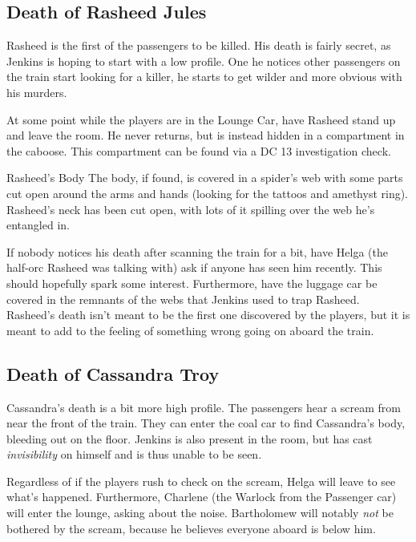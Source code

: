 \documentclass[letterpaper,10pt,twoside,twocolumn,openany]{dndbook}
\begin{document}
\subsection{Death of Rasheed Jules}
Rasheed is the first of the passengers to be killed.  His death is fairly secret, as Jenkins is hoping to start with a low profile.  One he notices other passengers on the train start looking for a killer, he starts to get wilder and more obvious with his murders.

At some point while the players are in the Lounge Car, have Rasheed stand up and leave the room.  He never returns, but is instead hidden in a compartment in the caboose.  This compartment can be found via a DC 13 investigation check.

\begin{paperbox}{Rasheed's Body}
  The body, if found, is covered in a spider's web with some parts cut open around the arms and hands (looking for the tattoos and amethyst ring).  Rasheed's neck has been cut open, with lots of it spilling over the web he's entangled in.
\end{paperbox}

If nobody notices his death after scanning the train for a bit, have Helga (the half-orc Rasheed was talking with) ask if anyone has seen him recently.  This should hopefully spark some interest.  Furthermore, have the luggage car be covered in the remnants of the webs that Jenkins used to trap Rasheed.  Rasheed's death isn't meant to be the first one discovered by the players, but it is meant to add to the feeling of something wrong going on aboard the train.

\subsection{Death of Cassandra Troy}
Cassandra's death is a bit more high profile.  The passengers hear a scream from near the front of the train.  They can enter the coal car to find Cassandra's body, bleeding out on the floor.  Jenkins is also present in the room, but has cast \textit{invisibility} on himself and is thus unable to be seen.

Regardless of if the players rush to check on the scream, Helga will leave to see what's happened.  Furthermore, Charlene (the Warlock from the Passenger car) will enter the lounge, asking about the noise.  Bartholomew will notably \textit{not} be bothered by the scream, because he believes everyone aboard is below him.
\end{document}
